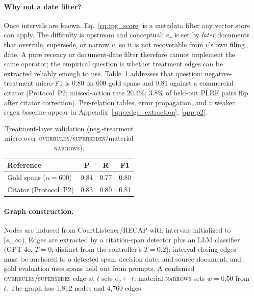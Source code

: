 \paragraph{Why not a date filter?} Once intervals are known, Eq.~\eqref{eq:tpg_score} is a metadata filter any vector store can apply. The difficulty is upstream and conceptual: $e_v$ is set by \emph{later} documents that overrule, supersede, or narrow $v$, so it is not recoverable from $v$'s own filing date. A pure recency or document-date filter therefore cannot implement the same operator; the empirical question is whether treatment edges can be extracted reliably enough to use. Table~\ref{tab:edge_summary} addresses that question: negative-treatment micro-F1 is 0.80 on 600 gold spans and 0.81 against a commercial citator (Protocol~P2; missed-action rate 20.4\%; 3.8\% of held-out PLRE pairs flip after citator correction). Per-relation tables, error propagation, and a weaker regex baseline appear in Appendix~\ref{app:edge_extraction}, \ref{app:p2}.

\begin{table}[t]
\centering
\caption{Treatment-layer validation (neg.-treatment micro over \textsc{overrules}/\textsc{supersedes}/material \textsc{narrows}).}
\label{tab:edge_summary}
\small
\setlength{\tabcolsep}{4pt}
\begin{tabular}{l c c c}
\toprule
\textbf{Reference} & \textbf{P} & \textbf{R} & \textbf{F1} \\
\midrule
Gold spans ($n{=}600$)   & 0.84 & 0.77 & 0.80 \\
Citator (Protocol~P2)    & 0.83 & 0.80 & 0.81 \\
\bottomrule
\end{tabular}
\end{table}

\paragraph{Graph construction.} Nodes are induced from CourtListener/RECAP with intervals initialized to $[s_v,\infty)$. Edges are extracted by a citation-span detector plus an LLM classifier (GPT-4o, $T{=}0$; distinct from the controller's $T{=}0.2$); interval-closing edges must be anchored to a detected span, decision date, and source document, and gold evaluation uses spans held out from prompts. A confirmed \textsc{overrules}/\textsc{supersedes} edge at $t$ sets $e_v\!\leftarrow\!t$; material \textsc{narrows} sets $w{=}0.50$ from $t$. The graph has 1{,}812 nodes and 4{,}760 edges.

